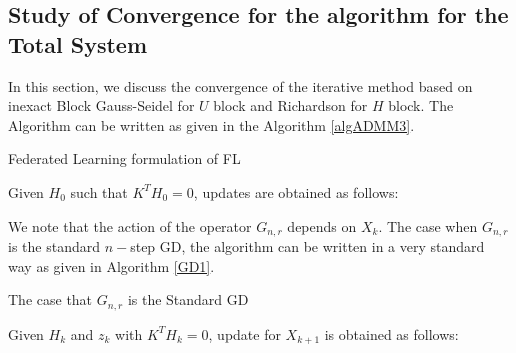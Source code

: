 \begin{itemize}
\subsection{Study of Convergence for the algorithm for the Total System} 
In this section, we discuss the convergence of the iterative method based on inexact Block Gauss-Seidel for $U$ block and Richardson for $H$ block. The Algorithm can be written as given in the Algorithm \ref{algADMM3}.
\begin{algorithm}
\caption{Federated Learning formulation of FL}\label{algADMM3} 
Given $H_0$ such that $K^TH_0 = 0$, updates are obtained as follows:  
\begin{algorithmic}
\EndFor
\end{algorithmic}
\end{algorithm}
We note that the action of the operator $G_{n,r}$ depends on $X_k$. The case when $G_{n,r}$ is the standard $n-$step GD, the algorithm can be written in a very standard way as given in Algorithm \ref{GD1}. 
\begin{algorithm}
\caption{The case that $G_{n,r}$ is the Standard GD}\label{GD1} 
Given $H_k$ and $z_k$ with $K^TH_k = 0$, update for $X_{k+1}$ is obtained as follows:  
\begin{algorithmic}
\EndFor
\end{algorithmic}
\end{algorithm}


\end{itemize}
